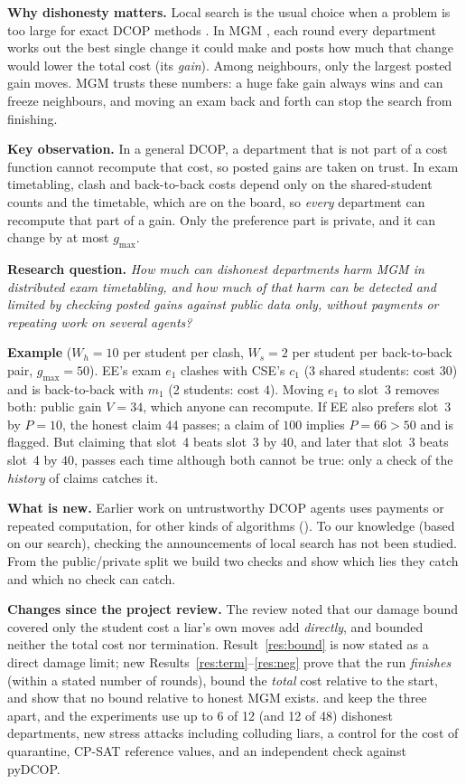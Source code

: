 \documentclass{article}
\theoremstyle{definition}
\newcommand{\1}{\mathbf{1}}
\newcommand{\gmax}{g_{\max}}
\begin{document}
\textbf{Why dishonesty matters.} Local search is the usual choice when a problem is too large for exact DCOP methods \citep{fioretto2018}. In MGM \citep{maheswaran2004mgm}, each round every department works out the best single change it could make and posts how much that change would lower the total cost (its \emph{gain}). Among neighbours, only the largest posted gain moves. MGM trusts these numbers: a huge fake gain always wins and can freeze neighbours, and moving an exam back and forth can stop the search from finishing.

\textbf{Key observation.} In a general DCOP, a department that is not part of a cost function cannot recompute that cost, so posted gains are taken on trust. In exam timetabling, clash and back-to-back costs depend only on the shared-student counts and the timetable, which are on the board, so \emph{every} department can recompute that part of a gain. Only the preference part is private, and it can change by at most $\gmax$.

\textbf{Research question.} \emph{How much can dishonest departments harm MGM in distributed exam timetabling, and how much of that harm can be detected and limited by checking posted gains against public data only, without payments or repeating work on several agents?}

\textbf{Example} ($W_h=10$ per student per clash, $W_s=2$ per student per back-to-back pair, $\gmax=50$). EE's exam $e_1$ clashes with CSE's $c_1$ (3 shared students: cost $30$) and is back-to-back with $m_1$ (2 students: cost $4$). Moving $e_1$ to slot~3 removes both: public gain $V=34$, which anyone can recompute. If EE also prefers slot~3 by $P=10$, the honest claim $44$ passes; a claim of $100$ implies $P=66>50$ and is flagged. But claiming that slot~4 beats slot~3 by $40$, and later that slot~3 beats slot~4 by $40$, passes each time although both cannot be true: only a check of the \emph{history} of claims catches it.

\textbf{What is new.} Earlier work on untrustworthy DCOP agents uses payments or repeated computation, for other kinds of algorithms (). To our knowledge (based on our search), checking the announcements of local search has not been studied. From the public/private split we build two checks and show which lies they catch and which no check can catch.

\textbf{Changes since the project review.} The review noted that our damage bound covered only the student cost a liar's own moves add \emph{directly}, and bounded neither the total cost nor termination. Result~\ref{res:bound} is now stated as a direct damage limit; new Results~\ref{res:term}--\ref{res:neg} prove that the run \emph{finishes} (within a stated number of rounds), bound the \emph{total} cost relative to the start, and show that no bound relative to honest MGM exists.  and  keep the three apart, and the experiments use up to 6 of 12 (and 12 of 48) dishonest departments, new stress attacks including colluding liars, a control for the cost of quarantine, CP-SAT reference values, and an independent check against pyDCOP.
\end{document}
